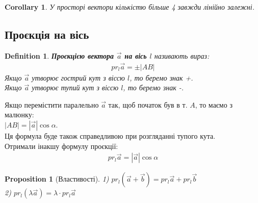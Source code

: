 \documentclass[a4paper, 10pt]{extarticle}
\theoremstyle{theoremdd}
\theoremstyle{theoremdd}
\newtheorem{definition}[theorem]{Definition}
\theoremstyle{theoremdd}
\theoremstyle{theoremdd}
\theoremstyle{theoremdd}
\newtheorem{proposition}[theorem]{Proposition}
\theoremstyle{theoremdd}
\theoremstyle{theoremdd}
\theoremstyle{theoremdd}
\newtheorem{corollary}[theorem]{Corollary}
\begin{document}
\begin{corollary}
	У просторі вектори кількістю більше 4 завжди лінійно залежні.
\end{corollary}
	
\subsection{Проєкція на вісь}
\begin{definition}
	\textbf{Проєкцією вектора $\vec{a}$ на вісь $l$} називають вираз:
	\begin{align*}
	pr_l \vec{a} = \pm |AB|
	\end{align*}
	Якщо $\vec{a}$ утворює гострий кут з віссю $l$, то беремо знак +.\\
	Якщо $\vec{a}$ утворює тупий кут з віссю $l$, то беремо знак -.
\begin{figure}[H]
\centering
\end{figure}
\end{definition}

	Якщо перемістити паралельно $\vec{a}$ так, щоб початок був в т. $A$, то маємо з малюнку:\\
	$|AB| = |\vec{a}| \cos \alpha$.\\
	Ця формула буде також справедливою при розгляданні тупого кута.\\
	Отримали інакшу формулу проєкції:
	\begin{align*}
	pr_l \vec{a} = |\vec{a}| \cos \alpha
	\end{align*}
	
\begin{proposition}[Властивості]
	1) $pr_l (\vec{a} + \vec{b}) = pr_l \vec{a} + pr_l \vec{b}$\\
	2) $pr_l (\lambda \vec{a}) = \lambda \cdot pr_l \vec{a}$\\
\end{proposition}
\end{document}
